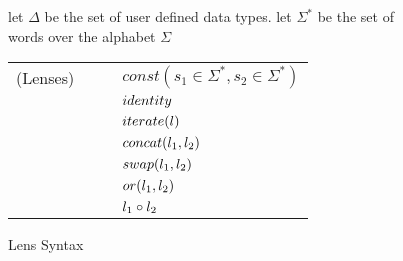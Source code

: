 

\begin{figure}

let $\Delta$ be the set of user defined data types.
let $\Sigma^*$ be the set of words over the alphabet $\Sigma$\\

\begin{tabular}{l@{\ }l@{\ }c@{\ }l}

(Lenses)& \Lens{} & \GEq{} & $const(s_1 \in \Sigma^*,s_2 \in \Sigma^*)$ \\
& & & \GBar{} $identity$\\
& & & \GBar{} $iterate(l)$ \\
& & & \GBar{} $concat(l_1,l_2)$ \\
& & & \GBar{} $swap(l_1,l_2)$ \\
& & & \GBar{} $or(l_1,l_2)$\\
& & & \GBar{} $l_1 \circ l_2$\\
\end{tabular}
\caption{Lens Syntax}
\label{fig:lens-syntax}
\end{figure}
